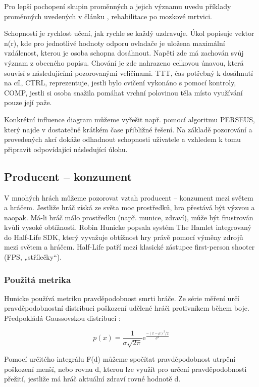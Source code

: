 Pro lepší pochopení skupin proměnných a jejich významu uvedu příklady proměnných uvedených v článku \cite{9Pomdp}, rehabilitace po mozkové mrtvici.

Schopností je rychlost učení, jak rychle se každý uzdravuje. Úkol popisuje vektor n(r), kde pro jednotlivé hodnoty odporu ovladače je uložena maximální vzdálenost, kterou je osoba schopna dosáhnout. Napětí zde má zachován svůj význam z obecného popisu. Chování je zde nahrazeno celkovou únavou, která souvisí s následujícími pozorovanými veličinami. TTT, čas potřebný k dosáhnutí na cíl, CTRL, reprezentuje, jestli bylo cvičení vykonáno s pomocí kontroly, COMP, jestli si osoba snažila pomáhat vrchní polovinou těla místo využívání pouze její paže.

Konkrétní influence diagram můžeme vyřešit např. pomocí algoritmu PERSEUS, který najde v dostatečně krátkém čase přibližné řešení. Na základě pozorování a provedených akcí dokáže odhadnout schopnosti uživatele a vzhledem k tomu připravit odpovídající následující úlohu.

\subsection{Producent – konzument}

V mnohých hrách můžeme pozorovat vztah producent – konzument mezi světem a hráčem. Jestliže hráč získá ze světa moc prostředků, hra přestává být výzvou a naopak. Má-li hráč málo prostředku (např. munice, zdraví), může být frustrován kvůli vysoké obtížnosti.
Robin Hunicke popsala systém The Hamlet integrovaný do Half-Life SDK\cite{20Hun}, který vyvažuje obtížnost hry právě pomocí výměny zdrojů mezi světem a hráčem. Half-Life patří mezi klasické zástupce first-person shooter (FPS, „střílečky“).

\subsubsection{Použitá metrika}

Hunicke používá metriku pravděpodobnost smrti hráče. Ze série měření určí pravděpodobnostní distribuci poškození udělené hráči protivníkem během boje. Předpokládá Gaussovskou distribuci :

\begin{equation}
	   p(x)=\frac{1}{\sigma\sqrt{2\pi}}\mathrm{e}^{\frac{-(x-\mu)^2/2}{\sigma^2}}
\end{equation}

Pomocí určitého integrálu F(d) můžeme spočítat pravděpodobnost utrpění poškození menší, nebo rovnu d, kterou lze využít pro určení pravděpodobnosti přežití, jestliže má hráč aktuální zdraví rovné hodnotě d.

